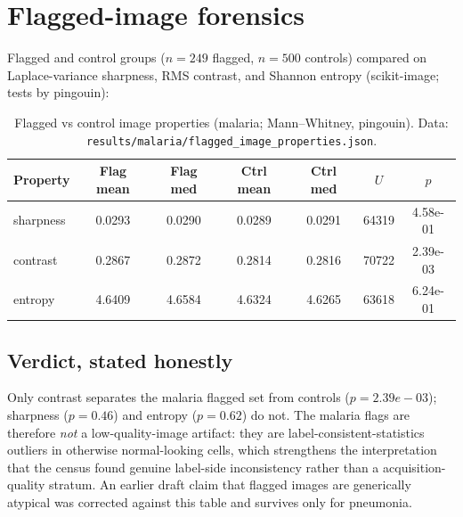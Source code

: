 \section{Flagged-image forensics}
Flagged and control groups ($n=249$ flagged, $n=500$ controls) compared on Laplace-variance sharpness, RMS contrast, and Shannon entropy (scikit-image; tests by pingouin):
\begin{table}[h]\centering\small
\begin{tabular}{lcccccc}
\hline
Property & Flag mean & Flag med & Ctrl mean & Ctrl med & $U$ & $p$ \\
\hline
sharpness & 0.0293 & 0.0290 & 0.0289 & 0.0291 & 64319 & 4.58e-01 \\
contrast & 0.2867 & 0.2872 & 0.2814 & 0.2816 & 70722 & 2.39e-03 \\
entropy & 4.6409 & 4.6584 & 4.6324 & 4.6265 & 63618 & 6.24e-01 \\
\hline
\end{tabular}
\caption{Flagged vs control image properties (malaria; Mann--Whitney, pingouin). Data: \texttt{results/malaria/flagged\_image\_properties.json}.}\label{tab:forensics}
\end{table}

\subsection{Verdict, stated honestly}
Only contrast separates the malaria flagged set from controls
($p=2.39e-03$); sharpness ($p=0.46$)
and entropy ($p=0.62$) do not. The malaria flags are
therefore \emph{not} a low-quality-image artifact: they are
label-consistent-statistics outliers in otherwise normal-looking cells,
which strengthens the interpretation that the census found genuine
label-side inconsistency rather than a acquisition-quality stratum. An
earlier draft claim that flagged images are generically atypical was
corrected against this table and survives only for pneumonia.
